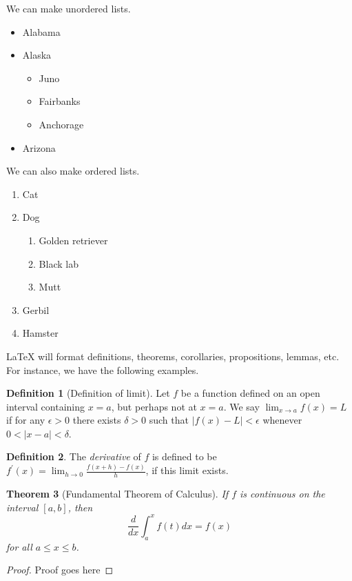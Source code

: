 \documentclass[12pt]{amsart}
\theoremstyle{plain}
\newtheorem{theorem}{Theorem}
\theoremstyle{definition}
\newtheorem{definition}[theorem]{Definition}
\begin{document}
We can make unordered lists.

\begin{itemize}
\item
Alabama
\item
Alaska
\begin{itemize}
\item
Juno
\item
Fairbanks
\item
Anchorage
\end{itemize}
\item
Arizona
\end{itemize}

We can also make ordered lists.

\begin{enumerate}
\item
Cat
\item
Dog
\begin{enumerate}
\item
Golden retriever
\item
Black lab
\item
Mutt
\end{enumerate}
\item
Gerbil
\item
Hamster
\end{enumerate}


LaTeX will format definitions, theorems, corollaries, propositions, lemmas, etc. For instance, we have the following examples.

\begin{definition}[Definition of limit]\label{def:limit}
Let $f$ be a function defined on an open interval containing $x=a$, but perhaps not at $x=a$. We say $\displaystyle\lim_{x\to a}f(x)=L$ if for any $\epsilon>0$ there exists $\delta>0$ such that $|f(x)-L|<\epsilon$ whenever $0<|x-a|<\delta$.
\end{definition}

\begin{definition}\label{def:deriv}
The \emph{ derivative} of $f$ is defined to be $\displaystyle f^\prime(x)=\lim_{h\to 0}\frac{f(x+h)-f(x)}{h}$, if this limit exists.
\end{definition}
 
\begin{theorem}[Fundamental Theorem of Calculus]\label{thm:ftc}
If $f$ is continuous on the interval $[a,b]$, then \[\frac{d}{dx}\int_a^x f(t)dx=f(x)\] for all $a\le x\le b$.
\end{theorem}
\begin{proof}
Proof goes here
\end{proof}
\end{document}
